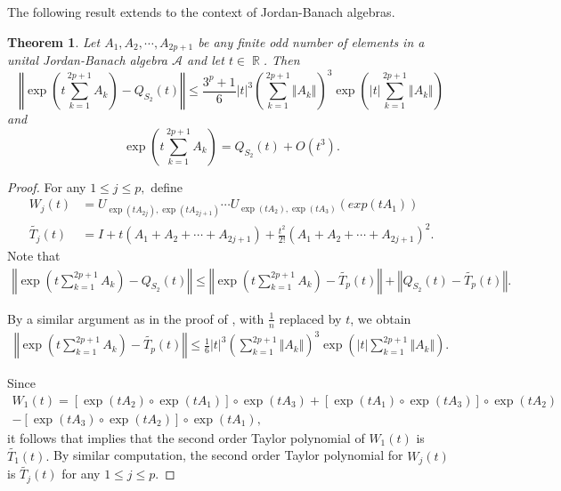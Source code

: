 \documentclass{article}
\theoremstyle{plain} %
\newtheorem{thm}{Theorem}[section]
\numberwithin{equation}{section}
\DeclareMathOperator{\Rdb}{{\mathbb R}}
\begin{document}
The following result extends \cite[Theorem 2.3]{wang:2023:suzuki} to the context of Jordan-Banach algebras.
\begin{thm}\label{thm:Trotter:quasisymmetric:JordanBanach}
 Let $A_1, A_2,\cdots, A_{2p+1}$ be any finite odd number of elements in a unital Jordan-Banach algebra $\mathcal{A}$ and let $t\in \Rdb$. Then
 \[
\left\Vert\exp\left(t\sum_{k=1}^{2p+1} A_k\right)-Q_{S_2}(t)\right \Vert \leq  \frac{3^{p}+1}{6}\vert t\vert^3\left(\sum_{k=1}^{2p+1}\Vert A_k\Vert\right)^3\exp\left(\vert t\vert\sum_{k=1}^{2p+1} \Vert A_k\Vert\right)
\]
and 
\[
\exp\left(t\sum_{k=1}^{2p+1} A_k\right)=Q_{S_2}(t)+O(t^3).	
\]
\end{thm}
\begin{proof}
For any $1\leq j\leq p,$ define
\begin{align}\label{notion:Qj}
W_{j}(t)&=U_{\exp(tA_{2j}), \exp(tA_{2j+1})}\cdots U_{\exp(tA_2), \exp(tA_3)}(exp(tA_1)) \\
\label{notion:Vj}
 \widetilde{T_j}(t)&=I+t\left(A_1+A_2+\cdots+A_{2j+1}\right)+\frac{t^2}{2!}\left(A_1+A_2+\cdots+A_{2j+1}\right)^2.
\end{align}
Note that 
\begin{align*}
\left\Vert\exp\left(t\sum_{k=1}^{2p+1} A_k\right)-Q_{S_2}(t)\right \Vert\leq 	\left\Vert\exp\left(t\sum_{k=1}^{2p+1} A_k\right)- \widetilde{T_p}(t)\right\Vert +\left\Vert Q_{S_2}(t)-\widetilde{T_p}(t)\right\Vert. 
\end{align*}

By a similar argument as in the proof of \cite[Theorem 3.3(i)]{chehade:wang:wang:2024:suzuki}, with $\displaystyle \frac{1}{n}$ replaced by $t$, we obtain
\begin{align*}
\left\Vert\exp\left(t\sum_{k=1}^{2p+1} A_k\right)- \widetilde{T_p}(t)\right\Vert\leq \frac{1}{6}\vert t\vert^3\left(\sum_{k=1}^{2p+1} \Vert A_k\Vert \right)^3\exp\left(\vert t\vert\sum_{k=1}^{2p+1} \Vert A_k\Vert\right).	
\end{align*}

Since 
\begin{align}
W_1(t)=[\exp(tA_2)\circ\exp(tA_1)]\circ \exp(tA_3)+ [\exp(tA_1)\circ \exp(tA_3)] \circ \exp(tA_2) \nonumber
\\ -[\exp(tA_3)\circ\exp(tA_2 )]\circ \exp(tA_1), \label{eqt:notion:W1}	
\end{align}
it follows that   implies that  the second order Taylor polynomial of $W_1(t)$ is $ \widetilde{T_1}(t).$ By similar computation, the second order Taylor polynomial for $W_j(t)$ is $ \widetilde{T_j}(t)$ for any $1\leq j\leq p$.


\end{proof}
\end{document}
